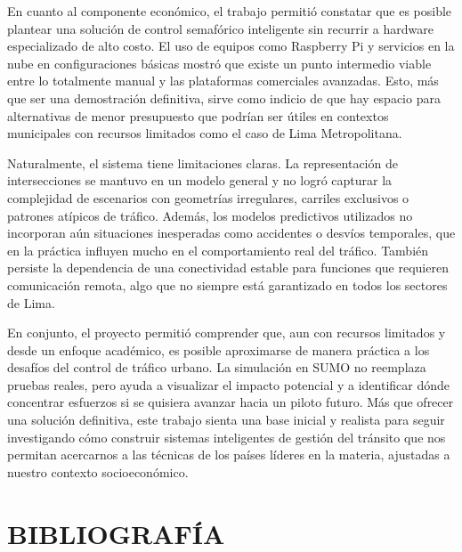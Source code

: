 \documentclass[12pt,a4paper,oneside]{report}
\begin{document}
En cuanto al componente económico, el trabajo permitió constatar que es posible plantear una solución de control semafórico inteligente sin recurrir a hardware especializado de alto costo. El uso de equipos como Raspberry Pi y servicios en la nube en configuraciones básicas mostró que existe un punto intermedio viable entre lo totalmente manual y las plataformas comerciales avanzadas. Esto, más que ser una demostración definitiva, sirve como indicio de que hay espacio para alternativas de menor presupuesto que podrían ser útiles en contextos municipales con recursos limitados como el caso de Lima Metropolitana.

Naturalmente, el sistema tiene limitaciones claras. La representación de intersecciones se mantuvo en un modelo general y no logró capturar la complejidad de escenarios con geometrías irregulares, carriles exclusivos o patrones atípicos de tráfico. Además, los modelos predictivos utilizados no incorporan aún situaciones inesperadas como accidentes o desvíos temporales, que en la práctica influyen mucho en el comportamiento real del tráfico. También persiste la dependencia de una conectividad estable para funciones que requieren comunicación remota, algo que no siempre está garantizado en todos los sectores de Lima.

En conjunto, el proyecto permitió comprender que, aun con recursos limitados y desde un enfoque académico, es posible aproximarse de manera práctica a los desafíos del control de tráfico urbano. La simulación en SUMO no reemplaza pruebas reales, pero ayuda a visualizar el impacto potencial y a identificar dónde concentrar esfuerzos si se quisiera avanzar hacia un piloto futuro. Más que ofrecer una solución definitiva, este trabajo sienta una base inicial y realista para seguir investigando cómo construir sistemas inteligentes de gestión del tránsito que nos permitan acercarnos a las técnicas de los países líderes en la materia, ajustadas a nuestro contexto socioeconómico.

\chapter*{BIBLIOGRAFÍA}\label{bibliografuxeda}
\end{document}
